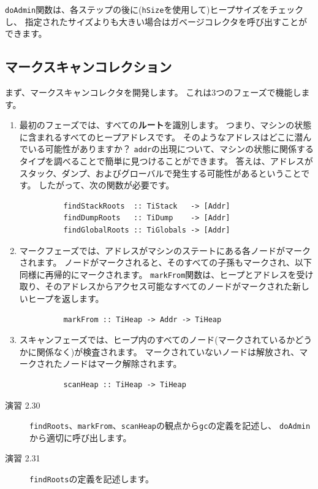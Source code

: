 \documentclass{jbook}
\begin{document}
\texttt{doAdmin}関数は、各ステップの後に(\texttt{hSize}を使用して)ヒープサイズをチェックし、
指定されたサイズよりも大きい場合はガベージコレクタを呼び出すことができます。

\subsection{マークスキャンコレクション}

まず、マークスキャンコレクタを開発します。
これは3つのフェーズで機能します。

\begin{enumerate}
	\item 最初のフェーズでは、すべての\textbf{ルート}を識別します。 つまり、マシンの状態に含まれるすべてのヒープアドレスです。
	      そのようなアドレスはどこに潜んでいる可能性がありますか？
	      \texttt{addr}の出現について、マシンの状態に関係するタイプを調べることで簡単に見つけることができます。
	      答えは、アドレスがスタック、ダンプ、およびグローバルで発生する可能性があるということです。
	      したがって、次の関数が必要です。
	      \begin{verbatim}
          findStackRoots  :: TiStack   -> [Addr]
          findDumpRoots   :: TiDump    -> [Addr]
          findGlobalRoots :: TiGlobals -> [Addr]
        \end{verbatim}
	\item マークフェーズでは、アドレスがマシンのステートにある各ノードがマークされます。
	      ノードがマークされると、そのすべての子孫もマークされ、以下同様に再帰的にマークされます。
	      \texttt{markFrom}関数は、ヒープとアドレスを受け取り、そのアドレスからアクセス可能なすべてのノードがマークされた新しいヒープを返します。
	      \begin{verbatim}
          markFrom :: TiHeap -> Addr -> TiHeap
        \end{verbatim}
	\item スキャンフェーズでは、ヒープ内のすべてのノード(マークされているかどうかに関係なく)が検査されます。
	      マークされていないノードは解放され、マークされたノードはマーク解除されます。
	      \begin{verbatim}
          scanHeap :: TiHeap -> TiHeap
        \end{verbatim}
\end{enumerate}

\begin{description}
	\item[演習 2.30] \texttt{findRoots}、\texttt{markFrom}、\texttt{scanHeap}の観点から\texttt{gc}の定義を記述し、
		\texttt{doAdmin}から適切に呼び出します。
	\item[演習 2.31] \texttt{findRoots}の定義を記述します。
\end{description}
\end{document}
